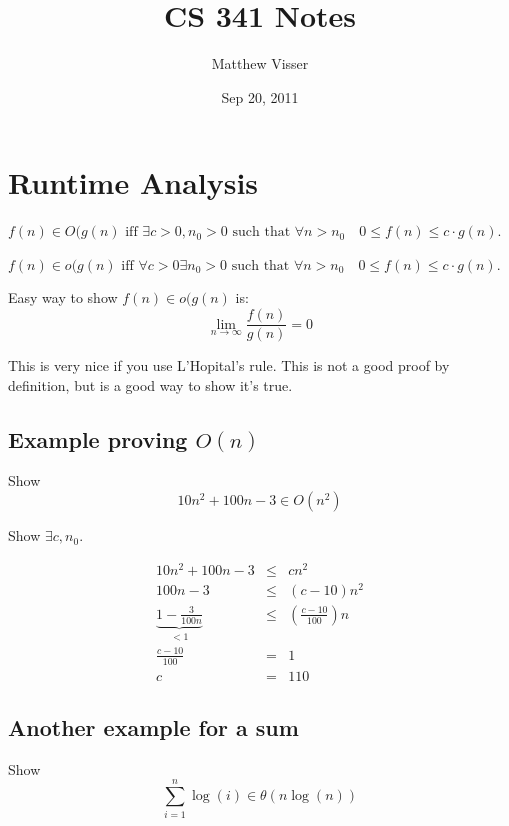 \documentclass[12pt]{article}
\begin{document}
\title{CS 341 Notes}
\author{Matthew Visser}
\date{Sep 20, 2011}
\maketitle

\section{Runtime Analysis}

$f(n) \in O(g(n) \text{ iff } \exists c>0, n_0>0 \text{ such that } \forall n >
n_0 \quad 0 \leq f(n) \leq c\cdot g(n)$.

$f(n) \in o(g(n) \text{ iff } \forall c>0 \exists n_0>0 \text{ such that }
\forall n > n_0 \quad 0 \leq f(n) \leq c\cdot g(n)$.

Easy way to show $f(n) \in o(g(n)$ is:
\begin{equation}
    \lim_{n \to \infty} \frac{f(n)}{g(n)} = 0
\end{equation}

This is very nice if you use L'Hopital's rule.  This is not a good proof by
definition, but is a good way to show it's true.

\subsection{Example proving $O(n)$}

Show 
\begin{equation}
    10n^2 + 100n - 3 \in O(n^2)
\end{equation}

Show $\exists c,n_0$.

\begin{eqnarray}
    10n^2 + 100n-3 &\leq& cn^2\\
    100n - 3 &\leq& (c-10)n^2\\
    \underbrace{ 1-\frac{3}{100n}}_{<1} &\leq& \left( \frac{c-10}{100} \right)n\\
    \frac{c-10}{100}&=& 1\\
    c&=&110
\end{eqnarray}

\subsection{Another example for a sum}

Show
\begin{equation}
    \sum_{i=1}^{n}\log(i) \in \theta\left( n\log(n) \right)
\end{equation}
\end{document}

